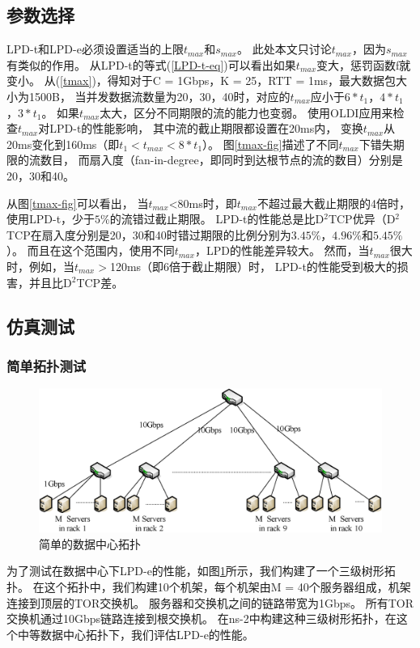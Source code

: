\subsection{参数选择}
LPD-t和LPD-e必须设置适当的上限$t_{max}$和$s_{max}$。
此处本文只讨论$t_{max}$，因为$s_{max}$有类似的作用。
从LPD-t的等式(\ref{LPD-t-eq})可以看出如果$t_{max}$变大，惩罚函数f就变小。
从(\ref{tmax})，得知对于C = 1Gbps，K = 25，RTT = 1ms，最大数据包大小为1500B，
当并发数据流数量为20，30，40时，对应的$t_{max}$应小于$6 * t_1$，$4 * t_1$，$3 * t_1$。
如果$t_{max}$太大，区分不同期限的流的能力也变弱。
使用OLDI应用来检查$t_{max}$对LPD-t的性能影响，
其中流的截止期限都设置在20ms内，
变换$t_{max}$从20ms变化到160ms（即$t_1 <t_{max} <8 * t_1$）。
图\ref{tmax-fig}描述了不同$t_{max}$下错失期限的流数目，
而扇入度（fan-in-degree，即同时到达根节点的流的数目）分别是20，30和40。


从图\ref{tmax-fig}可以看出，
当$t_{max} $<80ms时，即$t_{max}$不超过最大截止期限的4倍时，使用LPD-t，少于$5\%$的流错过截止期限。
LPD-t的性能总是比D$^2$TCP优异（D$^2$TCP在扇入度分别是20，30和40时错过期限的比例分别为$3.45\%$，$4.96\%$和$5.45\%$）。
而且在这个范围内，使用不同$t_{max}$，LPD的性能差异较大。
然而，当$t_{max}$很大时，例如，当$t_{max}>$120ms（即6倍于截止期限）时，
LPD-t的性能受到极大的损害，并且比D$^2$TCP差。


\subsection{仿真测试}

\subsubsection{简单拓扑测试}
\begin{figure}[H] 
  \centering
  \includegraphics[width=0.9\columnwidth]{figures/LPD/DataCenter.eps}
  \caption{简单的数据中心拓扑}
\label{DataCenterTop-fig}
\end{figure}

为了测试在数据中心下LPD-e的性能，如图\ref{DataCenterTop-fig}所示，我们构建了一个三级树形拓扑。
在这个拓扑中，我们构建10个机架，每个机架由M = 40个服务器组成，机架连接到顶层的TOR交换机。
服务器和交换机之间的链路带宽为1Gbps。
所有TOR交换机通过10Gbps链路连接到根交换机。
在ns-2中构建这种三级树形拓扑，在这个中等数据中心拓扑下，我们评估LPD-e的性能。

